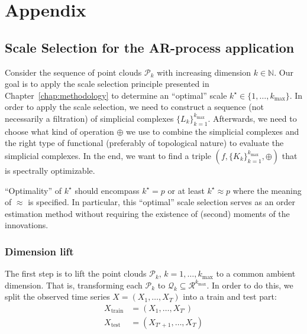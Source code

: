 \chapter{Appendix}

\section*{Scale Selection for the AR-process application}

Consider the sequence of point clouds $\mathcal{P}_k$ with increasing dimension $k\in\mathbb{N}$. Our goal is to apply the scale selection principle presented in Chapter~\ref{chap:methodology} to determine an \enquote{optimal} scale $k^{\star}\in\{1,\dots,k_{\max}\}$. In order to apply the scale selection, we need to construct a sequence (not necessarily a filtration) of simplicial complexes $\{L_k\}_{k=1}^{k_{\max}}$. Afterwards, we need to choose what kind of operation $\oplus$ we use to combine the simplicial complexes and the right type of functional (preferably of topological nature) to evaluate the simplicial complexes. In the end, we want to find a triple $(f,\{K_k\}_{k=1}^{k_{\max}},\oplus)$ that is spectrally optimizable.

\enquote{Optimality} of $k^{\star}$ should encompass $k^{\star}=p$ or at least $k^{\star}\approx p$ where the meaning of $\approx$ is specified. In particular, this \enquote{optimal} scale selection serves as an order estimation method without requiring the existence of (second) moments of the innovations.

\subsection*{Dimension lift}

The first step is to lift the point clouds $\mathcal{P}_k$, $k=1,\dots,k_{\max}$ to a common ambient dimension. That is, transforming each $\mathcal{P}_k$ to $\mathcal{Q}_k\subseteq\mathcal{R}^{k_{\max}}$. In order to do this, we split the observed time series $X=(X_1,\dots,X_T)$ into a train and test part:
\begin{align*}
    X_{\text{train}}&=(X_1,\dots,X_{T'})\\
    X_{\text{test}}&=(X_{T'+1},\dots,X_T)
\end{align*}

